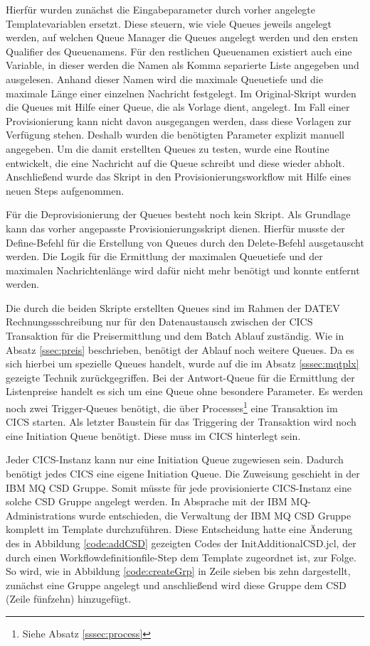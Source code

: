 Hierfür wurden zunächst die Eingabeparameter durch vorher angelegte Templatevariablen ersetzt.
Diese steuern, wie viele Queues jeweils angelegt werden, auf welchen Queue Manager die Queues angelegt werden und den ersten Qualifier des Queuenamens.
Für den restlichen Queuenamen existiert auch eine Variable, in dieser werden die Namen als Komma separierte Liste angegeben und ausgelesen.
Anhand dieser Namen wird  die maximale Queuetiefe und die maximale Länge einer einzelnen Nachricht festgelegt.
Im Original-Skript wurden die Queues mit Hilfe einer Queue, die als Vorlage dient, angelegt.
Im Fall einer Provisionierung kann nicht davon ausgegangen werden, dass diese Vorlagen zur Verfügung stehen.
Deshalb wurden die benötigten Parameter explizit manuell angegeben.
Um die damit erstellten Queues zu testen, wurde eine Routine entwickelt, die eine Nachricht auf die Queue schreibt und diese wieder abholt.
Anschließend wurde das Skript in den Provisionierungsworkflow mit Hilfe eines neuen Steps aufgenommen.

Für die Deprovisionierung der Queues besteht noch kein Skript.
Als Grundlage kann das vorher angepasste Provisionierungsskript dienen.
Hierfür musste der \glqq Define\grqq-Befehl für die Erstellung von Queues durch den \glqq Delete\grqq-Befehl ausgetauscht werden.
Die Logik für die Ermittlung der maximalen Queuetiefe und der maximalen Nachrichtenlänge wird dafür nicht mehr benötigt und konnte entfernt werden.

Die durch die beiden Skripte erstellten Queues sind im Rahmen der DATEV Rechnungssschreibung nur für den Datenaustausch zwischen der CICS Transaktion für die Preisermittlung und dem Batch Ablauf zuständig.
Wie in Absatz \ref{ssec:preis} beschrieben, benötigt der Ablauf noch weitere Queues.
Da es sich hierbei um spezielle Queues handelt, wurde auf die im Absatz \ref{sssec:mqtplx} gezeigte Technik zurückgegriffen.
Bei der Antwort-Queue für die Ermittlung der Listenpreise handelt es sich um eine Queue ohne besondere Parameter.
Es werden noch zwei Trigger-Queues benötigt, die über Processes\footnote{Siehe Absatz \ref{sssec:process}} eine Transaktion im CICS starten.
Als letzter Baustein für das Triggering der Transaktion wird noch eine Initiation Queue benötigt.
Diese muss im CICS hinterlegt sein.

Jeder CICS-Instanz kann nur eine Initiation Queue zugewiesen sein.
Dadurch benötigt jedes CICS eine eigene Initiation Queue.
Die Zuweisung geschieht in der IBM MQ CSD Gruppe.
Somit müsste für jede provisionierte CICS-Instanz eine solche CSD Gruppe angelegt werden.
In Absprache mit der IBM MQ-Administrations wurde entschieden, die Verwaltung der IBM MQ CSD Gruppe komplett im Template durchzuführen.
Diese Entscheidung hatte eine Änderung des in Abbildung \ref{code:addCSD} gezeigten Codes der \glqq InitAdditionalCSD.jcl\grqq, der durch einen Workflowdefinitionfile-Step dem Template zugeordnet ist, zur Folge.
So wird, wie in Abbildung \ref{code:createGrp} in Zeile sieben bis zehn dargestellt, zunächst eine Gruppe angelegt und anschließend wird diese Gruppe dem CSD (Zeile fünfzehn) hinzugefügt.

